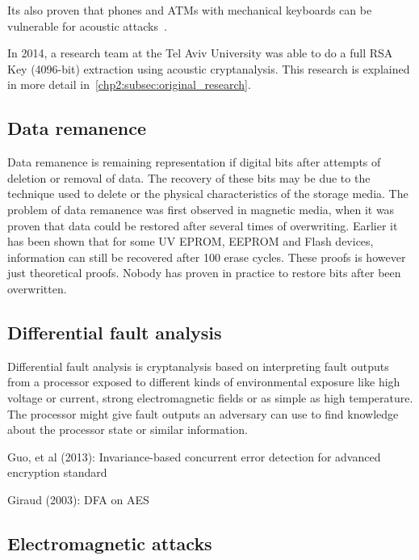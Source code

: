 Its also proven that phones and ATMs with mechanical keyboards can be vulnerable for acoustic attacks~\cite{DBLP:conf/sp/AsonovA04}.

In 2014, a research team at the Tel Aviv University was able to do a full RSA Key (4096-bit) extraction using acoustic cryptanalysis. 
This research is explained in more detail in~\autoref{chp2:subsec:original_research}.

\subsection{Data remanence}\label{chp2:subsec:data_remanence}

Data remanence is remaining representation if digital bits after attempts of deletion or removal of data. 
The recovery of these bits may be due to the technique used to delete or the physical characteristics of the storage media. 
The problem of data remanence was first observed in magnetic media, when it was proven that data could be restored after several times of overwriting. 
Earlier it has been shown that for some UV EPROM, EEPROM and Flash devices, information can still be recovered after 100 erase cycles\cite{DBLP:conf/ches/Skorobogatov05}.
These proofs is however just theoretical proofs. 
Nobody has proven in practice to restore bits after been overwritten. 

\subsection{Differential fault analysis}\label{chp2:subsec:differential_fault_analysis}

Differential fault analysis is cryptanalysis based on interpreting fault outputs from a processor exposed to different kinds of environmental exposure like high voltage or current, strong electromagnetic fields or as simple as high temperature. 
The processor might give fault outputs an adversary can use to find knowledge about the processor state or similar information.


Guo, et al (2013): Invariance-based concurrent error detection for advanced encryption standard~\cite{DBLP:journals/iacr/GuoK13}

Giraud (2003): DFA on AES~\cite{DBLP:journals/iacr/Giraud03}

\subsection{Electromagnetic attacks}\label{chp2:subsec:electromagnetic_attacks}

